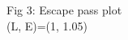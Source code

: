 \documentclass[preview]{standalone}
\begin{document}
\begin{center}
Fig 3: Escape pass plot\\ (L, E)=(1, 1.05)
\end{center}
\end{document}
